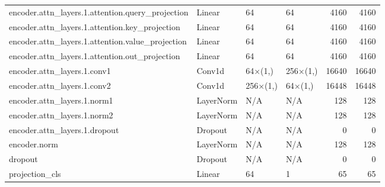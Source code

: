 \begin{table}
\begin{tabular}{llllrr}
encoder.attn_layers.1.attention.query_projection & Linear & 64 & 64 & 4160 & 4160 \\
encoder.attn_layers.1.attention.key_projection & Linear & 64 & 64 & 4160 & 4160 \\
encoder.attn_layers.1.attention.value_projection & Linear & 64 & 64 & 4160 & 4160 \\
encoder.attn_layers.1.attention.out_projection & Linear & 64 & 64 & 4160 & 4160 \\
encoder.attn_layers.1.conv1 & Conv1d & 64×(1,) & 256×(1,) & 16640 & 16640 \\
encoder.attn_layers.1.conv2 & Conv1d & 256×(1,) & 64×(1,) & 16448 & 16448 \\
encoder.attn_layers.1.norm1 & LayerNorm & N/A & N/A & 128 & 128 \\
encoder.attn_layers.1.norm2 & LayerNorm & N/A & N/A & 128 & 128 \\
encoder.attn_layers.1.dropout & Dropout & N/A & N/A & 0 & 0 \\
encoder.norm & LayerNorm & N/A & N/A & 128 & 128 \\
dropout & Dropout & N/A & N/A & 0 & 0 \\
projection_cls & Linear & 64 & 1 & 65 & 65 \\
\bottomrule
\end{tabular}
\end{table}
